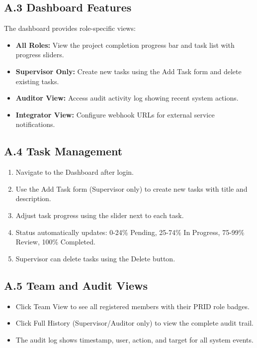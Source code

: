 ﻿\documentclass[12pt]{article}
\begin{document}
\subsection*{A.3 Dashboard Features}
The dashboard provides role-specific views:
\begin{itemize}
\item \textbf{All Roles:} View the project completion progress bar and task list with progress sliders.
\item \textbf{Supervisor Only:} Create new tasks using the Add Task form and delete existing tasks.
\item \textbf{Auditor View:} Access audit activity log showing recent system actions.
\item \textbf{Integrator View:} Configure webhook URLs for external service notifications.
\end{itemize}

\subsection*{A.4 Task Management}
\begin{enumerate}
\item Navigate to the Dashboard after login.
\item Use the Add Task form (Supervisor only) to create new tasks with title and description.
\item Adjust task progress using the slider next to each task.
\item Status automatically updates: 0-24\% Pending, 25-74\% In Progress, 75-99\% Review, 100\% Completed.
\item Supervisor can delete tasks using the Delete button.
\end{enumerate}

\subsection*{A.5 Team and Audit Views}
\begin{itemize}
\item Click Team View to see all registered members with their PRID role badges.
\item Click Full History (Supervisor/Auditor only) to view the complete audit trail.
\item The audit log shows timestamp, user, action, and target for all system events.
\end{itemize}

\newpage
\end{document}
